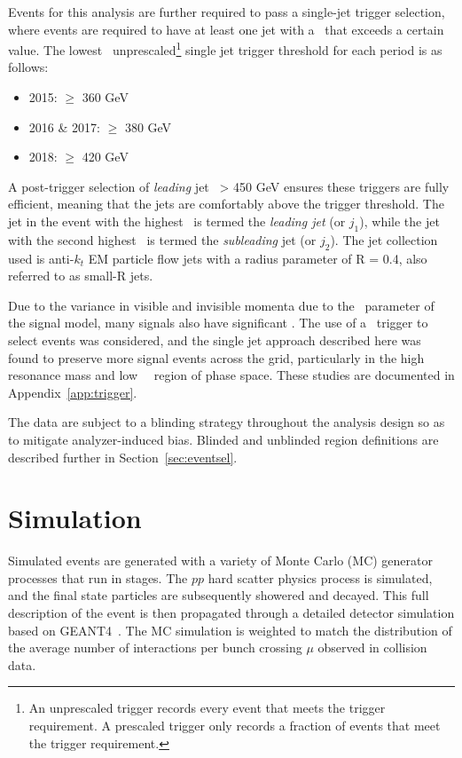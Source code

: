 Events for this analysis are further required to pass a single-jet trigger selection, where events are required to have at least one jet with a \pt~that exceeds a certain value. 
The lowest \pt~unprescaled\footnote{An unprescaled trigger records every event that meets the trigger requirement. A prescaled trigger only records a fraction of events that meet the trigger requirement.} single jet trigger threshold for each period is as follows: 

\begin{itemize}
\item 2015: \pt $\geq$ 360 GeV
\item 2016 \& 2017:  \pt $\geq$ 380 GeV
\item 2018:  \pt $\geq$ 420 GeV
\end{itemize}

A post-trigger selection of \textit{leading} jet \pt~> 450 GeV ensures these triggers are fully efficient, meaning that the jets are comfortably above the trigger threshold. The jet in the event with the highest \pt~is termed the \textit{leading jet} (or $j_1$), while the jet with the second highest \pt~is termed the \textit{subleading} jet (or $j_2$). The jet collection used is anti-$k_t$ EM particle flow jets with a radius parameter of R = 0.4, also referred to as small-R jets. \par

Due to the variance in visible and invisible momenta due to the \rinv~parameter of the signal model, many signals also have significant \met.
The use of a \met~trigger to select events was considered, and the single jet approach described here was found to preserve more signal events across the grid, particularly in the high resonance mass and low ~\rinv~region of phase space. These studies are documented in Appendix~\ref{app:trigger}.\par

The data are subject to a blinding strategy throughout the analysis design so as to mitigate analyzer-induced bias. 
Blinded and unblinded region definitions are described further in Section~\ref{sec:eventsel}.

\section{Simulation}
\label{sec:simulation}

Simulated events are generated with a variety of Monte Carlo (MC) generator processes that run in stages. The $pp$ hard scatter physics process is simulated, and the final state particles are subsequently showered and decayed. This full description of the event is then propagated through a detailed detector simulation based on GEANT4~\cite{Agostinelli:2002hh}. The MC simulation is weighted to match the distribution of the average number of interactions per bunch crossing $\mu$ observed in collision data.\par

